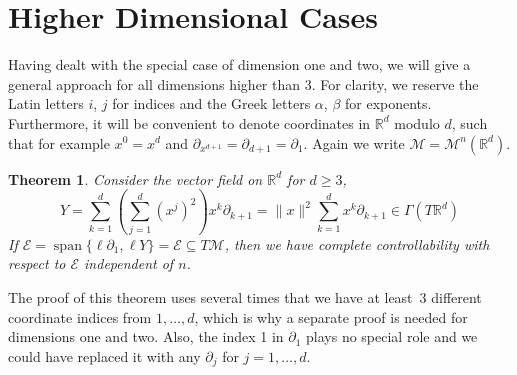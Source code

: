 \documentclass[10pt]{amsart}
\newcounter{dummy} \numberwithin{dummy}{section}
\newtheorem{theorem}[dummy]{Theorem}
\newtheorem{lemma}[dummy]{Lemma}
\theoremstyle{remark}
\newcommand{\R}{\mathbb{R}}
\DeclareMathOperator{\spn}{span}
\DeclareMathOperator{\SO}{SO}
\newcommand{\s}[1]{\Gamma(#1)}
\newcommand{\E}{\mathcal{E}}
\newcommand{\LM}{\mathcal{M}}
\numberwithin{equation}{section}
\begin{document}
\section{Higher Dimensional Cases}
Having dealt with the special case of dimension one and two, we will give a general approach for all dimensions higher than $3$.
For clarity, we reserve the Latin letters $i$, $j$ for indices and the Greek letters $\alpha$, $\beta$ for exponents. Furthermore, it will be convenient to denote coordinates in $\mathbb{R}^d$ modulo $d$, such that for example $x^0 = x^d$ and $\partial_{x^{d+1}} = \partial_{d+1} =\partial_1$. Again we write $\LM = \LM^n(\mathbb{R}^d)$.

\begin{theorem} \label{th:Higher}
Consider the vector field on $\mathbb{R}^d$ for $d \geq 3$,
\begin{equation}
Y = \sum_{k=1}^d \left( \sum_{j=1}^d (x^j)^2 \right) x^k \partial_{k+1} =\| x\|^2 \sum_{k=1}^d  x^k \partial_{k+1} \in \s{T\R^d}
\end{equation}
If $\E= \spn \{ \ell \partial_1, \ell Y\} = \E \subseteq T\LM$,
then we have complete controllability with respect to $\E$ independent of $n$.
\end{theorem}
The proof of this theorem uses several times that we have at least~3 different coordinate indices from $1, \dots, d$, which is why a separate proof is needed for dimensions one and two. Also, the index 1 in $\partial_1$ plays no special role and we could have replaced it with any $\partial_j$ for $j=1, \dots, d$.




\end{document}
